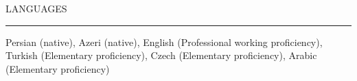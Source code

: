 \documentclass{resume} %
\renewenvironment{rSection}[1]{
\sectionskip
\textcolor{RoyalPurple}{\MakeUppercase{#1}}
\sectionlineskip
\hrule
\begin{list}{}{
\setlength{\leftmargin}{1.5em}
}
\item[]
}{
\end{list}
}
\begin{document}

\begin{rSection}{Languages}

Persian (native), Azeri (native), English (Professional working proficiency), Turkish (Elementary proficiency), Czech (Elementary proficiency), Arabic (Elementary proficiency)

\end{rSection}
\end{document}
